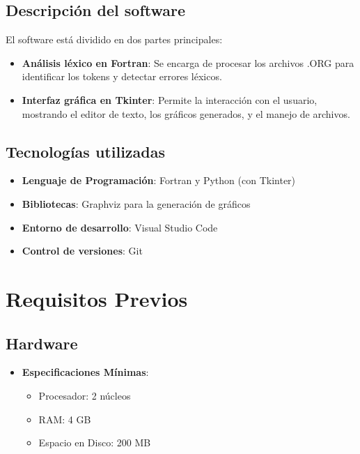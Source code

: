 \documentclass[12pt, letterpaper, twosite]{article}
\begin{document}
\subsection{Descripción del software}
El software está dividido en dos partes principales:
\begin{itemize}
    \item \textbf{Análisis léxico en Fortran}: Se encarga de procesar los archivos .ORG para identificar los tokens y detectar errores léxicos.
    \item \textbf{Interfaz gráfica en Tkinter}: Permite la interacción con el usuario, mostrando el editor de texto, los gráficos generados, y el manejo de archivos.
\end{itemize}

\subsection{Tecnologías utilizadas}
\begin{itemize}
    \item \textbf{Lenguaje de Programación}: Fortran y Python (con Tkinter)
    \item \textbf{Bibliotecas}: Graphviz para la generación de gráficos
    \item \textbf{Entorno de desarrollo}: Visual Studio Code
    \item \textbf{Control de versiones}: Git
\end{itemize}

\section{Requisitos Previos}
\subsection{Hardware}
\begin{itemize}
    \item \textbf{Especificaciones Mínimas}:
    \begin{itemize}
        \item Procesador: 2 núcleos
        \item RAM: 4 GB
        \item Espacio en Disco: 200 MB
    \end{itemize}
\end{itemize}
\end{document}
